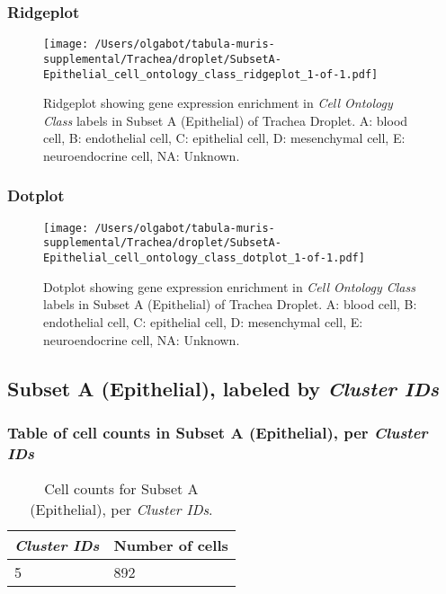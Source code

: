 \clearpage

\subsubsection{Ridgeplot}
\begin{figure}[h]
\centering
\texttt{[image: /Users/olgabot/tabula-muris-supplemental/Trachea/droplet/SubsetA-Epithelial\_cell\_ontology\_class\_ridgeplot\_1-of-1.pdf]}

\caption{ Ridgeplot  showing gene expression enrichment in \emph{Cell Ontology Class} labels in Subset A (Epithelial) of Trachea Droplet. A: blood cell, B: endothelial cell, C: epithelial cell, D: mesenchymal cell, E: neuroendocrine cell, NA: Unknown.}
\end{figure}


\clearpage

\subsubsection{Dotplot}
\begin{figure}[h]
\centering
\texttt{[image: /Users/olgabot/tabula-muris-supplemental/Trachea/droplet/SubsetA-Epithelial\_cell\_ontology\_class\_dotplot\_1-of-1.pdf]}

\caption{ Dotplot  showing gene expression enrichment in \emph{Cell Ontology Class} labels in Subset A (Epithelial) of Trachea Droplet. A: blood cell, B: endothelial cell, C: epithelial cell, D: mesenchymal cell, E: neuroendocrine cell, NA: Unknown.}
\end{figure}


\clearpage

\subsection{Subset A (Epithelial), labeled by \emph{Cluster IDs}}
\subsubsection{Table of cell counts in Subset A (Epithelial), per \emph{Cluster IDs}}\begin{table}[h]
\centering
\label{my-label}
\begin{tabular}{@{}ll@{}}
\toprule

\emph{Cluster IDs}& Number of cells \\ \midrule
5 & 892 \\
\bottomrule
\end{tabular}
\caption{Cell counts for Subset A (Epithelial), per \emph{Cluster IDs}.}
\end{table}

